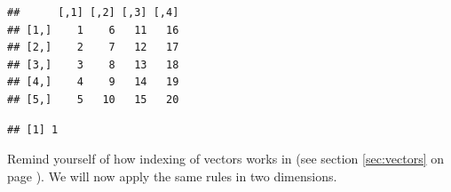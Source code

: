 \documentclass[krantz2]{krantz}\usepackage{knitr}
\begin{document}
\begin{knitrout}\footnotesize
{}\color{fgcolor}\begin{kframe}
\begin{alltt}
 \hlkwb{<-} \hlstd{(}\hlopt{:}\hlstd{,}  \hlstd{=} \hlstd{)}
\end{alltt}
\begin{verbatim}
##      [,1] [,2] [,3] [,4]
## [1,]    1    6   11   16
## [2,]    2    7   12   17
## [3,]    3    8   13   18
## [4,]    4    9   14   19
## [5,]    5   10   15   20
\end{verbatim}
\begin{alltt}
\hlstd{A[}\hlstd{,} \hlstd{]}
\end{alltt}
\begin{verbatim}
## [1] 1
\end{verbatim}
\end{kframe}
\end{knitrout}

Remind yourself of how indexing of vectors works in \Rlang (see section \ref{sec:vectors} on page \pageref{sec:vectors}). We will now apply the same rules in two dimensions.
\end{document}
